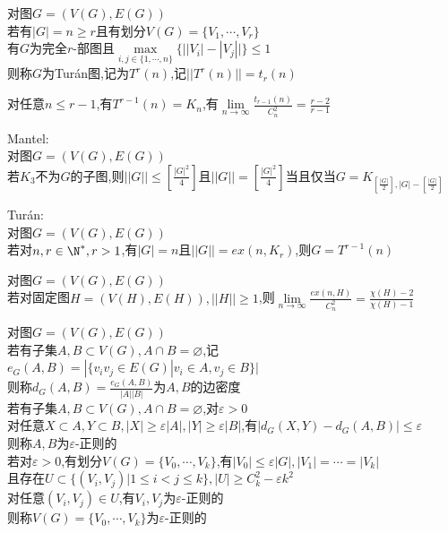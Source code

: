 \begin{dingyi}
对图$G=(V(G),E(G))$\\
若有$|G|=n\geq r$且有划分$V(G)=\{V_1,\cdots,V_r\}$\\
有$G$为完全$r$-部图且$\max\limits_{i,j\in \{1,\cdots,n\}}\{\Big||V_i|-|V_j|\Big|\}\leq 1$\\
则称$G$为Turán图,记为$T^{r}(n)$,记$||T^{r}(n)||=t_{r}(n)$
\end{dingyi}

\begin{zhu}
对任意$n\leq r-1$,有$T^{r-1}(n)=K_{n}$,有$\lim\limits_{n\to\infty}\frac{t_{r-1}(n)}{C_{n}^{2}}=\frac{r-2}{r-1}$
\end{zhu}

\begin{dingli}
Mantel:\\
对图$G=(V(G),E(G))$\\
若$K_3$不为$G$的子图,则$||G||\leq [\frac{|G|^2}{4}]$且$||G||=[\frac{|G|^2}{4}]$当且仅当$G=K_{[\frac{|G|}{2}],|G|-[\frac{|G|}{2}]}$
\end{dingli}

\begin{dingli}
Turán:\\
对图$G=(V(G),E(G))$\\
若对$n,r\in \N^*,r>1$,有$|G|=n$且$||G||=ex(n,K_{r})$,则$G=T^{r-1}(n)$
\end{dingli}

\begin{dingli}
对图$G=(V(G),E(G))$\\
若对固定图$H=(V(H),E(H)),||H||\geq 1$,则$\lim\limits_{n\to\infty}\frac{ex(n,H)}{C_{n}^{2}}=\frac{\chi(H)-2}{\chi(H)-1}$
\end{dingli}

\begin{dingyi}
对图$G=(V(G),E(G))$\\
若有子集$A,B\subset V(G),A\cap B=\varnothing$,记$e_{G}(A,B)=|\{v_iv_j\in E(G)|v_i\in A,v_j\in B\}|$\\
则称$d_{G}(A,B)=\frac{e_{G}(A,B)}{|A||B|}$为$A,B$的边密度\\
若有子集$A,B\subset V(G),A\cap B=\varnothing$,对$\varepsilon>0$\\
对任意$X\subset A, Y\subset B, |X|\geq \varepsilon |A|, |Y|\geq \varepsilon |B|$,有$|d_{G}(X,Y)-d_{G}(A,B)|\leq \varepsilon$\\
则称$A,B$为$\varepsilon$-正则的\\
若对$\varepsilon>0$,有划分$V(G)=\{V_0,\cdots,V_k\}$,有$|V_0|\leq \varepsilon|G|, |V_1|=\cdots=|V_k|$\\
且存在$U\subset \{(V_i,V_j)|1\leq i<j\leq k\},|U|\geq C_{k}^2-\varepsilon k^2$\\
对任意$(V_i,V_j)\in U$,有$V_i,V_j$为$\varepsilon$-正则的\\
则称$V(G)=\{V_0,\cdots,V_k\}$为$\varepsilon$-正则的
\end{dingyi}

